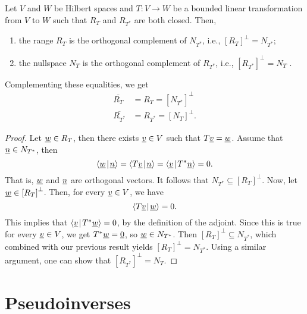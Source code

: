 \begin{theorem}
Let $V$ and $W$ be Hilbert spaces and $T \colon V \rightarrow W$ be a bounded linear transformation from $V$ to $W$ such that $R_T$ and $R_{T^*}$ are both closed.
Then,
\begin{enumerate}
\item the range $R_T$ is the orthogonal complement of $N_{T^*}$, i.e., $\left[ R_T \right]^{\bot} = N_{T^*}$;
\item the nullspace $N_T$ is the orthogonal complement of $R_{T^*}$, i.e., $\left[ R_{T^*} \right]^{\bot} = N_T$ .
\end{enumerate}
Complementing these equalities, we get
\begin{align*}
\overline{R_T} &= R_T = \left[ N_{T^*} \right]^{\bot} \\
\overline{R_{T^*}} &= R_{T^*} = \left[ N_T \right]^{\bot} .
\end{align*}
\end{theorem}
\begin{proof}
Let $\underline{w} \in R_T$, then there exists $\underline{v} \in V$ such that $T \underline{v} = \underline{w}$.
Assume that $\underline{n} \in N_{T^*}$, then
\begin{equation*}
{\left\langle  \underline{w}  \mskip2mu \middle| \mskip2mu  \underline{n}  \right\rangle}
= {\left\langle  T \underline{v}  \mskip2mu \middle| \mskip2mu  \underline{n}  \right\rangle}
= {\left\langle  \underline{v}  \mskip2mu \middle| \mskip2mu  T^* \underline{n}  \right\rangle}
= 0 .
\end{equation*}
That is, $\underline{w}$ and $\underline{n}$ are orthogonal vectors.
It follows that $N_{T^*} \subseteq \left[ R_T \right]^{\bot}$.
Now, let $\underline{w} \in \left[ R_T \right]^{\bot}$.
Then, for every $\underline{v} \in V$, we have
\begin{equation*}
{\left\langle  T \underline{v}  \mskip2mu \middle| \mskip2mu  \underline{w}  \right\rangle} = 0.
\end{equation*}
This implies that ${\left\langle  \underline{v}  \mskip2mu \middle| \mskip2mu  T^* \underline{w}  \right\rangle} = 0$, by the definition of the adjoint.
Since this is true for every $\underline{v} \in V$, we get $T^* \underline{w} = \underline{0}$, so $\underline{w} \in N_{T^*}$.
Then $\left[ R_T \right]^{\bot} \subseteq N_{T^*}$, which combined with our previous result yields $\left[ R_T \right]^{\bot} = N_{T^*}$.
Using a similar argument, one can show that $\left[ R_{T^*} \right]^{\bot} = N_T$.
\end{proof}


\section{Pseudoinverses}

